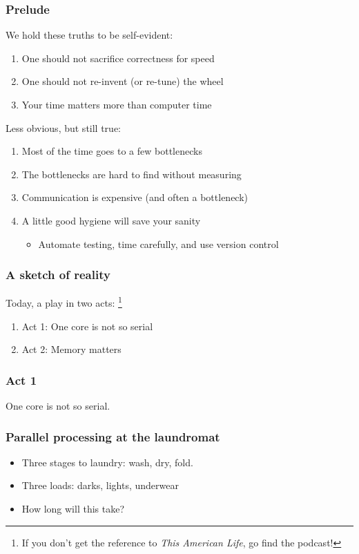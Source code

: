 \documentclass{beamer}
\begin{document}
\begin{frame}
  \frametitle{Prelude}

  We hold these truths to be self-evident:
  \begin{enumerate}
  \item One should not sacrifice correctness for speed
  \item One should not re-invent (or re-tune) the wheel
  \item Your time matters more than computer time
  \end{enumerate}
  
  Less obvious, but still true:
  \begin{enumerate}
  \item Most of the time goes to a few bottlenecks
  \item The bottlenecks are hard to find without measuring
  \item Communication is expensive (and often a bottleneck)
  \item A little good hygiene will save your sanity
    \begin{itemize}
    \item Automate testing, time carefully, and use version control
    \end{itemize}
  \end{enumerate}
\end{frame}

\begin{frame}
  \frametitle{A sketch of reality}

  Today, a play in two acts:%
\footnote{%
If you don't get the reference to {\em This American Life},
go find the podcast!}
  \begin{enumerate}
  \item Act 1: One core is not so serial
  \item Act 2: Memory matters
  \end{enumerate}
\end{frame}

\begin{frame}
  \frametitle{Act 1}
  One core is not so serial.
\end{frame}

\begin{frame}
  \frametitle{Parallel processing at the laundromat}

  \begin{itemize}
  \item Three stages to laundry: wash, dry, fold.
  \item Three loads: {\color{blue} darks}, {\color{red} lights}, {\color{green} underwear}
  \item How long will this take?
  \end{itemize}
\end{frame}
\end{document}
